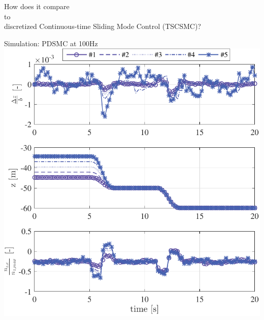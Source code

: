 \documentclass[12pt,svgnames,table,draft=false]{beamer}
\begin{document}
\usebackgroundtemplate{}

\begin{frame}
\centering
\Large
\vspace{3em}
How does it compare \\to\\ discretized Continuous-time Sliding Mode Control (TSCSMC)?
\end{frame}

\begin{frame}{Simulation: PDSMC at 100Hz}
\centering
\includegraphics[height=.6\paperwidth]{PDSMC-100Hz-TIMESCALESEPARATION-turbulence=1}    %
\end{frame}
\end{document}
